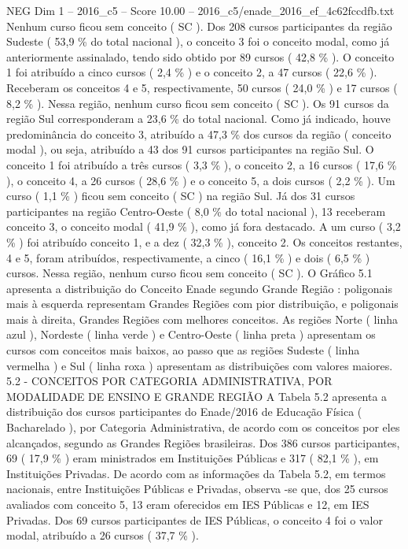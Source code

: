 \begin{textsample}{NEG Dim 1 – 2016\_c5 – Score 10.00 – 2016\_c5/enade\_2016\_ef\_4c62fccdfb.txt}
Nenhum curso ficou sem conceito ( SC ).
Dos 208 cursos participantes da região Sudeste ( 53,9 \% do total nacional ), o conceito 3 foi o conceito modal, como já anteriormente assinalado, tendo sido obtido por 89 cursos ( 42,8 \% ).
O conceito 1 foi atribuído a cinco cursos ( 2,4 \% ) e o conceito 2, a 47 cursos ( 22,6 \% ).
Receberam os conceitos 4 e 5, respectivamente, 50 cursos ( 24,0 \% ) e 17 cursos ( 8,2 \% ).
Nessa região, nenhum curso ficou sem conceito ( SC ).
Os 91 cursos da região Sul corresponderam a 23,6 \% do total nacional.
Como já indicado, houve predominância do conceito 3, atribuído a 47,3 \% dos cursos da região ( conceito modal ), ou seja, atribuído a 43 dos 91 cursos participantes na região Sul.
O conceito 1 foi atribuído a três cursos ( 3,3 \% ), o conceito 2, a 16 cursos ( 17,6 \% ), o conceito 4, a 26 cursos ( 28,6 \% ) e o conceito 5, a dois cursos ( 2,2 \% ).
Um curso ( 1,1 \% ) ficou sem conceito ( SC ) na região Sul.
Já dos 31 cursos participantes na região Centro-Oeste ( 8,0 \% do total nacional ), 13 receberam conceito 3, o conceito modal ( 41,9 \% ), como já fora destacado.
A um curso ( 3,2 \% ) foi atribuído conceito 1, e a dez ( 32,3 \% ), conceito 2.
Os conceitos restantes, 4 e 5, foram atribuídos, respectivamente, a cinco ( 16,1 \% ) e dois ( 6,5 \% ) cursos.
Nessa região, nenhum curso ficou sem conceito ( SC ).
O Gráfico 5.1 apresenta a distribuição do Conceito Enade segundo Grande Região : poligonais mais à esquerda representam Grandes Regiões com pior distribuição, e poligonais mais à direita, Grandes Regiões com melhores conceitos.
As regiões Norte ( linha azul ), Nordeste ( linha verde ) e Centro-Oeste ( linha preta ) apresentam os cursos com conceitos mais baixos, ao passo que as regiões Sudeste ( linha vermelha ) e Sul ( linha roxa ) apresentam as distribuições com valores maiores. 5.2 - CONCEITOS POR CATEGORIA ADMINISTRATIVA, POR MODALIDADE DE ENSINO E GRANDE REGIÃO A Tabela 5.2 apresenta a distribuição dos cursos participantes do Enade/2016 de Educação Física ( Bacharelado ), por Categoria Administrativa, de acordo com os conceitos por eles alcançados, segundo as Grandes Regiões brasileiras.
Dos 386 cursos participantes, 69 ( 17,9 \% ) eram ministrados em Instituições Públicas e 317 ( 82,1 \% ), em Instituições Privadas.
De acordo com as informações da Tabela 5.2, em termos nacionais, entre Instituições Públicas e Privadas, observa -se que, dos 25 cursos avaliados com conceito 5, 13 eram oferecidos em IES Públicas e 12, em IES Privadas.
Dos 69 cursos participantes de IES Públicas, o conceito 4 foi o valor modal, atribuído a 26 cursos ( 37,7 \% ).

\end{textsample}
